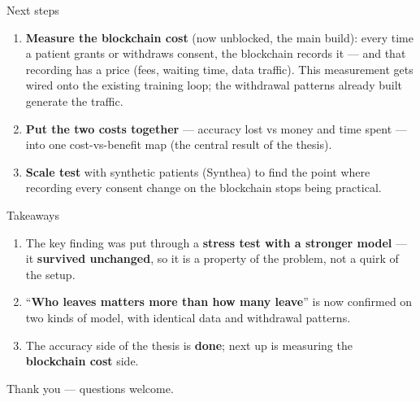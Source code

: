 \documentclass[aspectratio=169]{beamer}
\begin{document}
\begin{frame}{Next steps}
\begin{enumerate}
\item \textbf{Measure the blockchain cost} (now unblocked, the main build): every time
      a patient grants or withdraws consent, the blockchain records it --- and that
      recording has a price (fees, waiting time, data traffic). This measurement gets
      wired onto the existing training loop; the withdrawal patterns already built
      generate the traffic.
\item \textbf{Put the two costs together} --- accuracy lost vs money and time spent ---
      into one cost-vs-benefit map (the central result of the thesis).
\item \textbf{Scale test} with synthetic patients (Synthea) to find the point where
      recording every consent change on the blockchain stops being practical.
\end{enumerate}
\end{frame}

\begin{frame}{Takeaways}
\begin{enumerate}
\item The key finding was put through a \textbf{stress test with a stronger model} ---
      it \textbf{survived unchanged}, so it is a property of the problem, not a quirk
      of the setup.
\item ``\textbf{Who leaves matters more than how many leave}'' is now confirmed on two
      kinds of model, with identical data and withdrawal patterns.
\item The accuracy side of the thesis is \textbf{done}; next up is measuring the
      \textbf{blockchain cost} side.
\end{enumerate}
\vfill
\begin{center}\large Thank you --- questions welcome.\end{center}
\end{frame}
\end{document}
